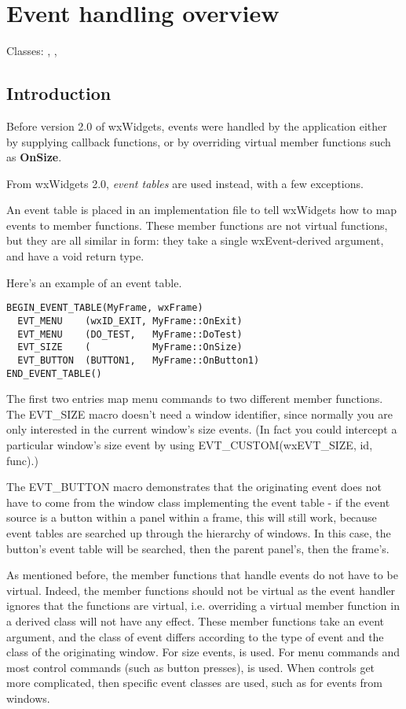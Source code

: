 \section{Event handling overview}\label{eventhandlingoverview}

Classes: , , 

\subsection{Introduction}

Before version 2.0 of wxWidgets, events were handled by the application
either by supplying callback functions, or by overriding virtual member
functions such as {\bf OnSize}.

From wxWidgets 2.0, {\it event tables} are used instead, with a few exceptions.

An event table is placed in an implementation file to tell wxWidgets how to map
events to member functions. These member functions are not virtual functions, but
they are all similar in form: they take a single wxEvent-derived argument, and have a void return
type.

Here's an example of an event table.

\begin{verbatim}
BEGIN_EVENT_TABLE(MyFrame, wxFrame)
  EVT_MENU    (wxID_EXIT, MyFrame::OnExit)
  EVT_MENU    (DO_TEST,   MyFrame::DoTest)
  EVT_SIZE    (           MyFrame::OnSize)
  EVT_BUTTON  (BUTTON1,   MyFrame::OnButton1)
END_EVENT_TABLE()
\end{verbatim}

The first two entries map menu commands to two different member functions. The EVT\_SIZE macro
doesn't need a window identifier, since normally you are only interested in the
current window's size events. (In fact you could intercept a particular window's size event
by using EVT\_CUSTOM(wxEVT\_SIZE, id, func).)

The EVT\_BUTTON macro demonstrates that the originating event does not have to come from
the window class implementing the event table - if the event source is a button within a panel within a frame, this will still
work, because event tables are searched up through the hierarchy of windows. In this
case, the button's event table will be searched, then the parent panel's, then the frame's.

As mentioned before, the member functions that handle events do not have to be virtual.
Indeed, the member functions should not be virtual as the event handler ignores that
the functions are virtual, i.e. overriding a virtual member function in a derived class
will not have any effect.
These member functions take an event argument, and the class of event differs according
to the type of event and the class of the originating window. For size
events,  is used. For menu commands and most control
commands (such as button presses),  is used.
When controls get more complicated, then specific event classes are used, such
as  for events from  windows.

